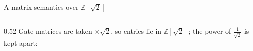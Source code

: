 \begin{frame}{A matrix semantics over $\mathbb{Z}[\sqrt2]$ \New}
\begin{columns}[c]
\begin{column}{0.52\textwidth}
\renewcommand{\AgdaCodeStyle}{\scriptsize}
\small Gate matrices are taken $\times\sqrt2$, so entries lie in
$\mathbb{Z}[\sqrt2]$; the power of $\frac1{\sqrt2}$ is kept apart:
\begin{code}%
\>[0]\AgdaSpace{}%
\AgdaSymbol{:}\AgdaSpace{}%
\AgdaSpace{}%
\AgdaSpace{}%
\<%
\\
\>[0]\AgdaSpace{}%
\AgdaSpace{}%
\AgdaSymbol{=}\AgdaSpace{}%
\AgdaSpace{}%
\AgdaSpace{}%
\AgdaSpace{}%
\AgdaSpace{}%
\AgdaSpace{}%
\AgdaSpace{}%
\<%
\\
%
\\[\AgdaEmptyExtraSkip]%
\>[0]\AgdaSpace{}%
\AgdaSymbol{:}\AgdaSpace{}%
\AgdaSpace{}%
\AgdaSpace{}%
\<%
\\
\>[0]\AgdaSpace{}%
\AgdaSpace{}%
\AgdaSymbol{=}\AgdaSpace{}%
\AgdaSpace{}%
\AgdaSpace{}%
\AgdaSpace{}%
%
\>[29]\<%
\\
%
\\[\AgdaEmptyExtraSkip]%
\>[0]\AgdaOperator{\AgdaFunction{\AgdaUnderscore{}\textasciitilde{}\AgdaUnderscore{}}}\AgdaSpace{}%
\AgdaSymbol{:}\AgdaSpace{}%
\AgdaSpace{}%
\AgdaSpace{}%
\AgdaSpace{}%
\AgdaSpace{}%
\AgdaSpace{}%
\AgdaSpace{}%
\<%
\\
\>[0]\AgdaSpace{}%
\AgdaOperator{\AgdaFunction{\textasciitilde{}}}\AgdaSpace{}%
\AgdaSpace{}%
\AgdaSymbol{=}\AgdaSpace{}%
\AgdaSymbol{((}\AgdaSpace{}%
\AgdaSpace{}%
\AgdaSymbol{)}\AgdaSpace{}%
\AgdaSpace{}%
\AgdaSpace{}%
\AgdaSymbol{)}\AgdaSpace{}%
\AgdaSpace{}%
\AgdaSymbol{((}\AgdaSpace{}%
\AgdaSpace{}%

\end{code}
\end{column}
\end{columns}
\end{frame}
